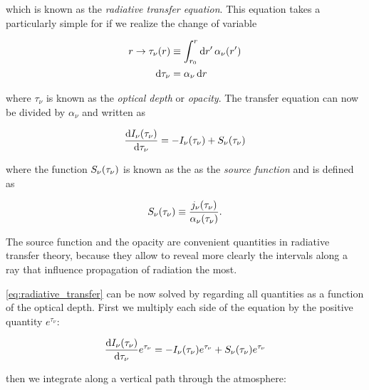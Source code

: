 which is known as the \emph{radiative transfer equation}. This equation
takes a particularly simple for if we realize the change of variable

\begin{equation}
        \begin{split}
                r \rightarrow \tau_\nu\qty(r) & \equiv \int^r_{r_0}
                \dd{r'}\alpha_\nu\qty(r') \\
                \dd{\tau_\nu} & = \alpha_\nu \dd{r}
        \end{split}
\end{equation}

where $\tau_\nu$ is known as the \emph{optical depth} or \emph{opacity}.
The transfer equation can now be divided by $\alpha_\nu$ and written as

\begin{equation}
        \dv{I_\nu\qty(\tau_\nu)}{\tau_\nu} = -I_\nu(\tau_\nu) +
        S_\nu\qty(\tau_\nu)
        \label{eq:radiative_transfer}
\end{equation}

where the function $S_\nu\qty(\tau_\nu)$ is known as the as the \emph{source
function} and is defined as

\begin{equation}
        S_\nu(\tau_\nu) \equiv
        \frac{j_\nu\qty(\tau_\nu)}{\alpha_\nu\qty(\tau_\nu)}.
\end{equation}

The source function and the opacity are convenient quantities in radiative
transfer theory, because they allow to reveal more clearly the intervals
along a ray that influence propagation of radiation the most.

\autoref{eq:radiative_transfer} can be now solved by regarding all
quantities as a function of the optical depth. First we multiply each side
of the equation by the positive quantity $e^{\tau_\nu}$:

\begin{equation}
        \dv{I_\nu\qty(\tau_\nu)}{\tau_\nu}e^{\tau_\nu} =
        -I_\nu\qty(\tau_\nu)e^{\tau_\nu} +
        S_\nu\qty(\tau_\nu)e^{\tau_\nu}
\end{equation}

then we integrate along a vertical path through the atmosphere:

